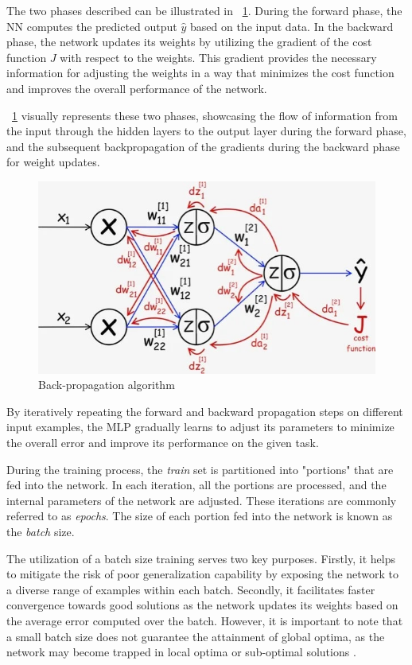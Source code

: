 The two phases described can be illustrated in \Fig~\ref{fig:backprop}. During the forward phase, the NN computes the predicted output $\hat{y}$ based on the input data. In the backward phase, the network updates its weights by utilizing the gradient of the cost function $J$ with respect to the weights. This gradient provides the necessary information for adjusting the weights in a way that minimizes the cost function and improves the overall performance of the network.

\Fig~\ref{fig:backprop} visually represents these two phases, showcasing the flow of information from the input through the hidden layers to the output layer during the forward phase, and the subsequent backpropagation of the gradients during the backward phase for weight updates.

\begin{figure}[h]
	\centering
	\includegraphics[width=0.6\linewidth]{ImageFiles/NeuralNetworks/backprop}
	\caption{Back-propagation algorithm \cite{UIBASP}}
	\label{fig:backprop}
\end{figure}

By iteratively repeating the forward and backward propagation steps on different input examples, the MLP gradually learns to adjust its parameters to minimize the overall error and improve its performance on the given task. 



During the training process, the \textit{train} set is partitioned into "portions" that are fed into the network. In each iteration, all the portions are processed, and the internal parameters of the network are adjusted. These iterations are commonly referred to as \textit{epochs}. The size of each portion fed into the network is known as the \textit{batch} size.

The utilization of a batch size training serves two key purposes. Firstly, it helps to mitigate the risk of poor generalization capability by exposing the network to a diverse range of examples within each batch. Secondly, it facilitates faster convergence towards good solutions as the network updates its weights based on the average error computed over the batch. However, it is important to note that a small batch size does not guarantee the attainment of global optima, as the network may become trapped in local optima or sub-optimal solutions \cite{KANDEL2020312}.

